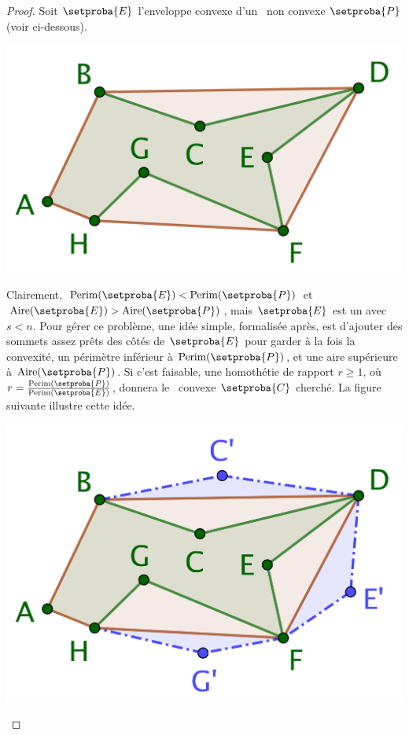 \begin{proof}
	Soit $\setproba{E}$ l'enveloppe convexe d'un \ngone\ non convexe $\setproba{P}$ (voir ci-dessous).
	
	\begin{center}
		\centering
		\small\itshape
		\includegraphics[scale=.45]{content/polygon/sol-must-be/convex-hull.png}
	\end{center}
	
		
	Clairement,
	$\perim{\setproba{E}} < \perim{\setproba{P}}$
	et
	$\area{\setproba{E}} > \area{\setproba{P}}$,
	mais
	$\setproba{E}$ est un  avec $s < n$. 
	Pour gérer ce problème, une idée simple, formalisée après, est d'ajouter des sommets assez prêts des côtés de $\setproba{E}$ pour garder à la fois
	la convexité, 
	un périmètre inférieur à $\perim{\setproba{P}}$, 
	et
	une aire supérieure à $\area{\setproba{P}}$.
	Si c'est faisable, une homothétie de rapport $r \geq 1$, où $r = \frac{ \perim{\setproba{P}} }{ \perim{\setproba{E}} }$, donnera le \ngone\ convexe $\setproba{C}$ cherché.
	La figure suivante illustre cette idée.
	
	\begin{center}
		\includegraphics[scale=.45]{content/polygon/sol-must-be/convex-hull-distortion.png}
	\end{center}


\end{proof}
